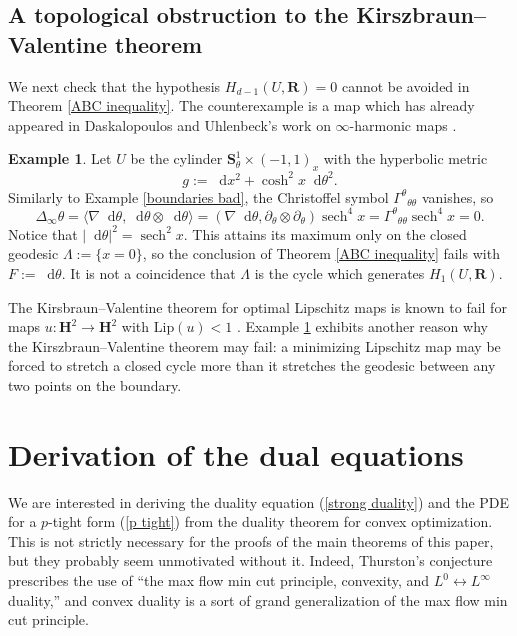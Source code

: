 \documentclass[reqno,11pt]{amsart}
\newcommand{\RR}{\mathbf{R}}
\newcommand{\Hyp}{\mathbf H}
\newcommand{\Sph}{\mathbf S}
\newcommand*\dif{\mathop{}\!\mathrm{d}}
\DeclareMathOperator{\sech}{sech}
\newcommand{\Lip}{\mathrm{Lip}}
\theoremstyle{definition}
\newtheorem{example}[theorem]{Example}
\numberwithin{equation}{section}
\begin{document}
\subsection{A topological obstruction to the Kirszbraun--Valentine theorem}
We next check that the hypothesis $H_{d - 1}(U, \RR) = 0$ cannot be avoided in Theorem \ref{ABC inequality}.
The counterexample is a map which has already appeared in Daskalopoulos and Uhlenbeck's work on $\infty$-harmonic maps \cite[\S8]{daskalopoulos2022}.

\begin{example}\label{exactness needed}
Let $U$ be the cylinder $\Sph^1_\theta \times (-1, 1)_x$ with the hyperbolic metric
$$g := \dif x^2 + \cosh^2 x \dif \theta^2.$$
Similarly to Example \ref{boundaries bad}, the Christoffel symbol ${\Gamma^\theta}_{\theta \theta}$ vanishes, so
$$\Delta_\infty \theta = \langle \nabla \dif \theta, \dif \theta \otimes \dif \theta\rangle = (\nabla \dif \theta, \partial_\theta \otimes \partial_\theta) \sech^4 x =  {\Gamma^\theta}_{\theta \theta} \sech^4 x = 0.$$
Notice that $|\dif \theta|^2 = \sech^2 x$.
This attains its maximum only on the closed geodesic $\Lambda := \{x = 0\}$, so the conclusion of Theorem \ref{ABC inequality} fails with $F := \dif \theta$.
It is not a coincidence that $\Lambda$ is the cycle which generates $H_1(U, \RR)$.
\end{example}

The Kirsbraun--Valentine theorem for optimal Lipschitz maps is known to fail for maps $u: \Hyp^2 \to \Hyp^2$ with $\Lip(u) < 1$ \cite[Example 9.6]{Gu_ritaud_2017}.
Example \ref{exactness needed} exhibits another reason why the Kirszbraun--Valentine theorem may fail: a minimizing Lipschitz map may be forced to stretch a closed cycle more than it stretches the geodesic between any two points on the boundary.

\section{Derivation of the dual equations}\label{duality derivation}
We are interested in deriving the duality equation (\ref{strong duality}) and the PDE for a $p$-tight form (\ref{p tight}) from the duality theorem for convex optimization.
This is not strictly necessary for the proofs of the main theorems of this paper, but they probably seem unmotivated without it.
Indeed, Thurston's conjecture prescribes the use of ``the max flow min cut principle, convexity, and $L^0 \leftrightarrow L^\infty$ duality,'' and convex duality is a sort of grand generalization of the max flow min cut principle.
\end{document}
